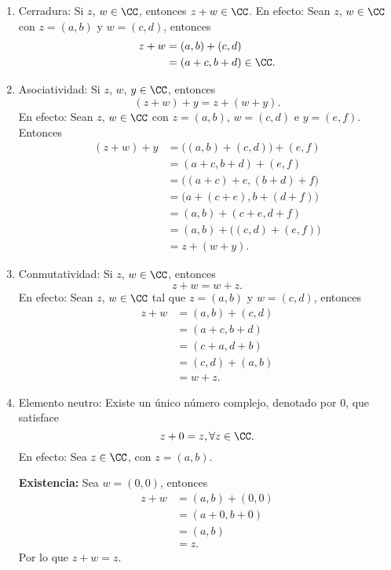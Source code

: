 \begin{enumerate}[label=A\arabic*.]
    \item Cerradura: Si $z$, $w \in \CC$, entonces $z + w \in \CC$. En efecto: Sean $z$, $w \in \CC$ con $z = (a, b)$ y $w = (c, d)$, entonces
    \begin{align*}
        z + w & = (a, b) + (c, d) \\
        & = (a + c, b + d) \in \CC.
    \end{align*}
    \item Asociatividad: Si $z$, $w$, $y \in \CC$, entonces
    $$(z + w) + y = z + (w + y).$$
    En efecto: Sean $z$, $w \in \CC$ con $z = (a, b)$, $w = (c, d)$ e $y = (e, f)$. Entonces
    \begin{align*}
        (z + w) + y & = \big((a, b) + (c, d)\big) + (e, f) \\
        & = (a + c, b + d) + (e, f) \\
        & = \big((a + c) + e, (b + d) + f\big) \\
        & = \big(a + (c + e), b + (d + f)\big) \\
        & = (a, b) + (c + e, d + f) \\
        & = (a, b) + \big((c, d) + (e, f)\big) \\
        & = z + (w + y).
    \end{align*}
    \item Conmutatividad: Si $z$, $w \in \CC$, entonces
    $$z + w = w + z.$$
    En efecto: Sean $z$, $w \in \CC$ tal que $z = (a, b)$ y $w = (c, d)$, entonces
    \begin{align*}
        z + w & = (a, b) + (c, d) \\
        & = (a + c, b + d) \\
        & = (c + a, d + b) \\
        & = (c, d) + (a, b) \\
        & = w + z.
    \end{align*}
    \item Elemento neutro: Existe un único número complejo, denotado por $0$, que satisface
    $$z + 0 = z, \forall z \in \CC.$$
    En efecto: Sea $z \in \CC$, con $z = (a, b)$.
    
    \textbf{Existencia:} Sea $w = (0, 0)$, entonces
    \begin{align*}
        z + w & = (a, b) + (0, 0) \\
        & = (a + 0, b + 0) \\
        & = (a, b) \\
        & = z.
    \end{align*}
    Por lo que $z + w = z$.
    

\end{enumerate}
